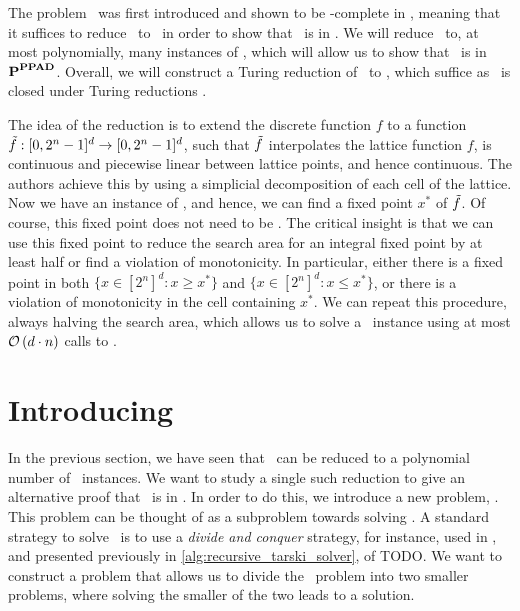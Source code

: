 The problem \Brouwer\ was first introduced and shown to be \PPAD-complete in , meaning that it suffices to reduce \Tarski\ to \Brouwer\ in order to show that \Tarski\ is in \PPAD. We will reduce \Tarski\ to, at most polynomially, many instances of \Brouwer, which will allow us to show that \Tarski\ is in $\textbf{P}^{\textbf{PPAD}}$. Overall, we will construct a Turing reduction of \Tarski\ to \Brouwer, which suffice as \PPAD\ is closed under Turing reductions .

The idea of the reduction is to extend the discrete function $f$ to a function $\Tilde{f} : [0, 2^n - 1]^d \rightarrow [0, 2^n - 1]^d$, such that $\Tilde{f}$ interpolates the lattice function $f$, is continuous and piecewise linear between lattice points, and hence continuous. The authors achieve this by using a simplicial decomposition of each cell of the lattice. Now we have an instance of \Brouwer, and hence, we can find a fixed point $x^*$ of $\Tilde{f}$. Of course, this fixed point does not need to be 
.
The critical insight is that we can use this fixed point to reduce the search area for an integral fixed point by at least half or find a violation of monotonicity. In particular, either there is a fixed point in both $\{x \in [2^n]^d : x \geq x^*\}$ and $\{x \in [2^n]^d : x \leq x^*\}$, or there is a violation of monotonicity in the cell containing $x^*$.
We can repeat this procedure, always halving the search area, which allows us to solve a \Tarski\ instance using at most $\mathcal{O}\left(d \cdot n\right)$ calls to \Brouwer.

\section{Introducing \Tarskistar}

In the previous section, we have seen that \Tarski\ can be reduced to a polynomial number of \Brouwer\ instances. We want to study a single such reduction to give an alternative proof that \Tarski\ is in \PPAD. In order to do this, we introduce a new problem, \Tarskistar. This problem can be thought of as a subproblem towards solving \Tarski. A standard strategy to solve \Tarski\ is to use a \emph{divide and conquer} strategy, for instance, used in , and presented previously in \cref{alg:recursive_tarski_solver}, of TODO. We want to construct a problem that allows us to divide the \Tarski\ problem into two smaller problems, where solving the smaller of the two leads to a solution.

